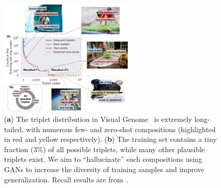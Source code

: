 \begin{figure}[t] 
    \centering
	\includegraphics[width=0.57\textwidth]{motivation.pdf}
	\caption{ \small (\textbf{a}) The triplet distribution in Visual Genome~\citep{krishna2017visual} is extremely long-tailed, with numerous few- and zero-shot compositions (highlighted in red and yellow respectively). (\textbf{b}) The training set contains a tiny fraction (3\%) of all possible triplets, while many other plausible triplets exist. We aim to ``hallucinate'' such compositions using GANs to increase the diversity of training samples and improve generalization. Recall results are from~\citep{tang2020unbiased}.}
	\label{fig:iccv_motivation}
\end{figure}

